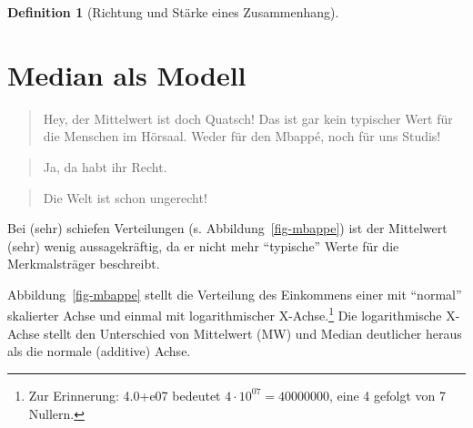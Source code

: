 \documentclass[
  a4paper,
  DIV=11]{scrreprt}
\theoremstyle{definition}
\theoremstyle{definition}
\theoremstyle{definition}
\newtheorem{definition}{Definition}[chapter]
\theoremstyle{remark}
\begin{document}
\begin{definition}[Richtung und Stärke eines
Zusammenhang]
\section{Median als Modell}\label{sec-median}

\begin{quote}
{} Hey, der Mittelwert ist doch Quatsch! Das ist gar kein
typischer Wert für die Menschen im Hörsaal. Weder für den Mbappé, noch
für uns Studis!
\end{quote}

\begin{quote}
{} Ja, da habt ihr Recht.
\end{quote}

\begin{quote}
{} Die Welt ist schon ungerecht!
\end{quote}

\begin{tcolorbox}[enhanced jigsaw, leftrule=.75mm, opacitybacktitle=0.6, colback=white, colframe=quarto-callout-important-color-frame, coltitle=black, colbacktitle=quarto-callout-important-color!10!white, opacityback=0, left=2mm, breakable, titlerule=0mm, toptitle=1mm, bottomtitle=1mm, rightrule=.15mm, title=\textcolor{quarto-callout-important-color}{\faExclamation}\hspace{0.5em}{Wichtig}, arc=.35mm, bottomrule=.15mm, toprule=.15mm]

Bei (sehr) schiefen Verteilungen (s. Abbildung~\ref{fig-mbappe}) ist der
Mittelwert (sehr) wenig aussagekräftig, da er nicht mehr ``typische''
Werte für die Merkmalsträger beschreibt.

\end{tcolorbox}

Abbildung~\ref{fig-mbappe} stellt die Verteilung des Einkommens einer
mit ``normal'' skalierter Achse und einmal mit logarithmischer
X-Achse.\footnote{Zur Erinnerung: 4.0+e07 bedeutet
  \(4 \cdot 10^{07} = 40000000\), eine 4 gefolgt von 7 Nullern.} Die
logarithmische X-Achse stellt den Unterschied von Mittelwert (MW) und
Median deutlicher heraus als die normale (additive) Achse.

\begin{figure}

\begin{minipage}{\linewidth}

\end{minipage}
\end{figure}
\end{definition}
\end{document}

